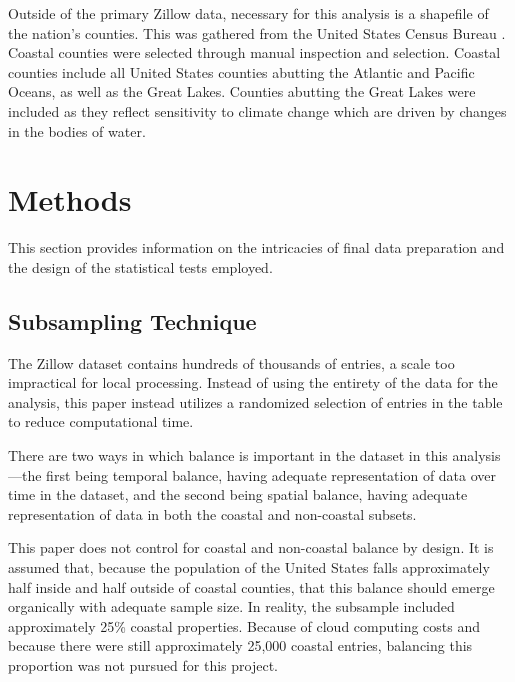 \documentclass[12pt]{article}
\begin{document}
Outside of the primary Zillow data, necessary for this analysis is a shapefile of the nation's counties. This was gathered from the United States Census Bureau \citep{USCensusCountyShapefile2025}. Coastal counties were selected through manual inspection and selection. Coastal counties include all United States counties abutting the Atlantic and Pacific Oceans, as well as the Great Lakes. Counties abutting the Great Lakes were included as they reflect sensitivity to climate change which are driven by changes in the bodies of water. \cite{theuerkauf2021rapid}

\section{Methods}
\label{sec:meth}

This section provides information on the intricacies of final data preparation and the design of the statistical tests employed.

\subsection{Subsampling Technique}

The Zillow dataset contains hundreds of thousands of entries, a scale too impractical for local processing. Instead of using the entirety of the data for the analysis, this paper instead utilizes a randomized selection of entries in the table to reduce computational time. 

There are two ways in which balance is important in the dataset in this analysis---the first being temporal balance, having adequate representation of data over time in the dataset, and the second being spatial balance, having adequate representation of data in both the coastal and non-coastal subsets. 

This paper does not control for coastal and non-coastal balance by design. It is assumed that, because the population of the United States falls approximately half inside and half outside of coastal counties, that this balance should emerge organically with adequate sample size. In reality, the subsample included approximately 25\% coastal properties. Because of cloud computing costs and because there were still approximately 25,000 coastal entries, balancing this proportion was not pursued for this project.
\end{document}
